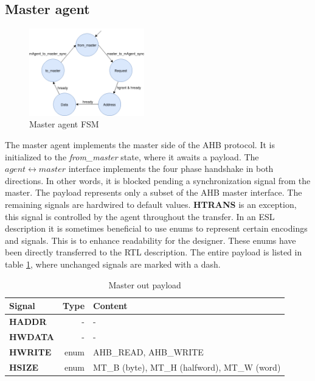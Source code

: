 \subsection{Master agent}
\begin{figure}
\includegraphics[width=5cm]{figs/hw/mAgent_FSM.png}
\caption{Master agent FSM}\label{fig:rafsm}
\end{figure}  

The master agent implements the master side of the AHB protocol. It is initialized to the \textit{from\_master} state, where it awaits a payload. The $agent\leftrightarrow master$ interface implements the four phase handshake in both directions. In other words, it is blocked pending a synchronization signal from the master. The payload represents only a subset of the AHB master interface. The remaining signals are hardwired to default values. \textbf{HTRANS} is an exception, this signal is controlled by the agent throughout the transfer. In an ESL description it is sometimes beneficial to use enums to represent certain encodings and signals. This is to enhance readability for the designer. These enums have been directly transferred to the RTL description. The entire payload is listed in table \ref{tab:mpayload}, where unchanged signals are marked with a dash.  

\begin{table}[hbt] 
  \label{tab:mpayload}
  \begin{tabular}{|p{25mm}|r|p{10cm}|} 
  \hline
  \textbf{Signal} & \textbf{Type} & \textbf{Content} \\
    \hline
  \textbf{HADDR} & - & - \\
    \hline
  \textbf{HWDATA} & - & - \\
    \hline
  \textbf{HWRITE} & enum & AHB\_READ, AHB\_WRITE \\
    \hline  
\textbf{HSIZE} & enum & MT\_B (byte), MT\_H (halfword), MT\_W (word) \\
    \hline
  \end{tabular}
\caption{Master out payload}
\end{table}

